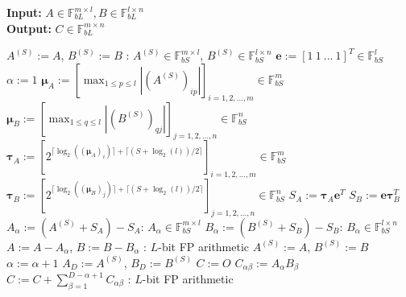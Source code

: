 \begin{algorithm}[htb]
    \small
    \caption{Ozaki scheme for multiple-precision matrix multiplication}\label{algo:ozaki_scheme}
	\hspace*{\algorithmicindent} \textbf{Input:} $A \in \mathbb{F}_{bL}^{m\times l}, B \in\mathbb{F}_{bL}^{l\times n}$ \\
	\hspace*{\algorithmicindent} \textbf{Output:} $C \in \mathbb{F}_{bL}^{m\times n}$
    \begin{algorithmic}
        \STATE $A^{(S)} := A$, $B^{(S)} := B$ : $A^{(S)} \in \mathbb{F}_{bS}^{m\times l}$, $B^{(S)} \in \mathbb{F}_{bS}^{l\times n}$
		\STATE $\mathbf{e} := [1\ 1\ ...\ 1]^T\in \mathbb{F}_{bS}^l$
		\STATE $\alpha := 1$
			\STATE ${\boldsymbol\mu}_A := [\max_{1 \leq p \leq l} |(A^{(S)})_{ip}|]_{i=1, 2, ..., m} \in \mathbb{F}_{bS}^m$
			\STATE ${\boldsymbol\mu}_B := [\max_{1 \leq q \leq l} |(B^{(S)})_{qj}|]_{j=1, 2, ..., n} \in \mathbb{F}_{bS}^n$
			\STATE ${\boldsymbol\tau}_A := [2^{\lceil \log_2(({\boldsymbol\mu}_A)_i)\rceil + \lceil (S + \log_2(l)) / 2 \rceil} ]_{i = 1, 2, ..., m} \in \mathbb{F}_{bS}^m$
			\STATE ${\boldsymbol\tau}_B := [2^{\lceil \log_2(({\boldsymbol\mu}_B)_j)\rceil + \lceil (S + \log_2(l)) / 2 \rceil} ]_{j = 1, 2, ..., n} \in \mathbb{F}_{bS}^n$
			\STATE $S_A := \boldsymbol\tau_A \mathbf{e}^T$
			\STATE $S_B := \mathbf{e} \boldsymbol\tau_B^T$
			\STATE $A_\alpha := (A^{(S)} + S_A) - S_A$: $A_\alpha \in \mathbb{F}_{bS}^{m\times l}$
			\STATE $B_\alpha := (B^{(S)} + S_B) - S_B$: $B_\alpha \in \mathbb{F}_{bS}^{l\times n}$
			\STATE $A := A - A_\alpha$, $B := B - B_\alpha$ : $L$-bit FP arithmetic
			\STATE $A^{(S)} := A$, $B^{(S)} := B$
			\STATE $\alpha := \alpha + 1$  
		\ENDWHILE
		\STATE $A_D := A^{(S)}$, $B_D := B^{(S)}$
		\STATE $C := O$
				\STATE $C_{\alpha\beta} := A_\alpha B_\beta$
			\ENDFOR
			\STATE $C := C + \sum^{D - \alpha + 1}_{\beta = 1} C_{\alpha\beta}$ : $L$-bit FP arithmetic
		\ENDFOR
    \end{algorithmic}
\end{algorithm}

